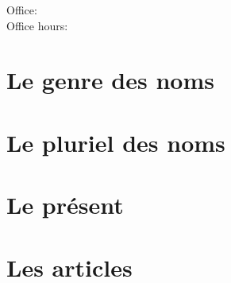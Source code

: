 \documentclass{beamer}
\subtitle[Quantités et révision]{Les adverbes de quantité et la révision}
\begin{document}
  \begin{frame}
    \titlepage
    \tiny{Office: \\
          Office hours: }
  \end{frame}


  \begin{frame}
    \hypertarget{début}{}
    \tableofcontents[hideallsubsections]
  \end{frame}

  \section{Le genre des noms}
  \section{Le pluriel des noms}
  \section{Le présent}
  \section{Les articles}
\end{document}
